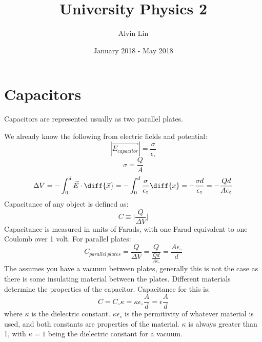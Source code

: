 \documentclass{math}
\title{University Physics 2}
\author{Alvin Lin}
\date{January 2018 - May 2018}
\begin{document}
\maketitle

\section*{Capacitors}
Capacitors are represented usually as two parallel plates.
\begin{center}
\end{center}
We already know the following from electric fields and potential:
\[ |\overrightarrow{E_{capacitor}}| = \frac{\sigma}{\epsilon_{\circ}} \]
\[ \sigma = \frac{Q}{A} \]
\[ \Delta V = -\int_{0}^{d}\vec{E}\cdot\diff{\vec{x}} =
  -\int_{0}^{d}\frac{\sigma}{\epsilon_{\circ}}\diff{x} =
  -\frac{\sigma d}{\epsilon_{\circ}} =
  -\frac{Qd}{A\epsilon_{\circ}} \]
Capacitance of any object is defined as:
\[ C \equiv \bigg|\frac{Q}{\Delta V}\bigg| \]
Capacitance is measured in units of Farads, with one Farad equivalent to one
Coulomb over 1 volt. For parallel plates:
\[ C_{parallel~plates} = \frac{Q}{\Delta V} =
  \frac{Q}{\frac{Qd}{A\epsilon_{\circ}}} =
  \frac{A\epsilon_{\circ}}{d} \]
The assumes you have a vacuum between plates, generally this is not the case as
there is some insulating material between the plates. Different materials
determine the properties of the capacitor. Capacitance for this is:
\[ C = C_{\circ}\kappa = \kappa\epsilon_{\circ}\frac{A}{d} =
  \epsilon\frac{A}{d} \]
where \( \kappa \) is the dielectric constant. \( \kappa\epsilon_{\circ} \) is
the permitivity of whatever material is used, and both constants are properties
of the material. \( \kappa \) is always greater than 1, with \( \kappa = 1 \)
being the dielectric constant for a vacuum.
\end{document}

